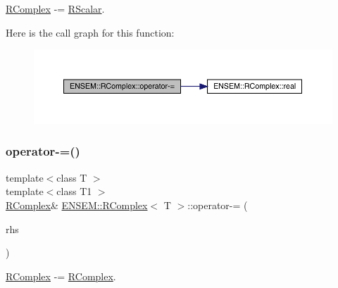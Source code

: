 \mbox{\hyperlink{classENSEM_1_1RComplex}{R\+Complex}} -\/= \mbox{\hyperlink{classENSEM_1_1RScalar}{R\+Scalar}}. 

Here is the call graph for this function\+:
\nopagebreak
\begin{figure}[H]
\begin{center}
\leavevmode
\includegraphics[width=350pt]{d9/d0e/classENSEM_1_1RComplex_af071c8c8f4d2a2cf17a9e4b01accf6bc_cgraph}
\end{center}
\end{figure}
\mbox{\label{classENSEM_1_1RComplex_aa2ad7391f0a0df5381ae7402b8b1fdb8}} 
\subsubsection{\texorpdfstring{operator-\/=()}{operator-=()}\hspace{0.1cm}{\footnotesize\ttfamily [4/6]}}
{\footnotesize\ttfamily template$<$class T $>$ \\
template$<$class T1 $>$ \\
\mbox{\hyperlink{classENSEM_1_1RComplex}{R\+Complex}}\& \mbox{\hyperlink{classENSEM_1_1RComplex}{E\+N\+S\+E\+M\+::\+R\+Complex}}$<$ T $>$\+::operator-\/= (\begin{DoxyParamCaption}\item[{const \mbox{\hyperlink{classENSEM_1_1RComplex}{R\+Complex}}$<$ T1 $>$ \&}]{rhs }\end{DoxyParamCaption})\hspace{0.3cm}{\ttfamily [inline]}}



\mbox{\hyperlink{classENSEM_1_1RComplex}{R\+Complex}} -\/= \mbox{\hyperlink{classENSEM_1_1RComplex}{R\+Complex}}. 


